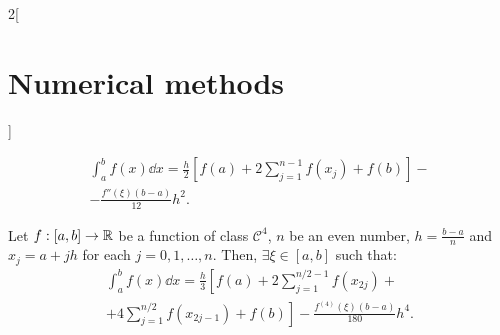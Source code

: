 \documentclass[../../../main.tex]{subfiles}
\begin{document}
\begin{multicols}{2}[\section{Numerical methods}]
\begin{theorem}
    \begin{multline*}
        \int_a^bf(x)\dd x=\frac{h}{2}\left[f(a)+2\sum_{j=1}^{n-1}f(x_j)+f(b)\right]-\\-\frac{f''(\xi)(b-a)}{12}h^2.
    \end{multline*}
\end{theorem}
\begin{theorem}
    Let $f:[a,b]\rightarrow\mathbb{R}$ be a function of class $\mathcal{C}^4$, $n$ be an even number, $h=\frac{b-a}{n}$ and $x_j=a+jh$ for each $j=0,1,\ldots,n$. Then, $\exists\xi\in[a,b]$ such that:
    \begin{multline*}
        \int_a^bf(x)\dd x=\frac{h}{3}\left[f(a)+2\sum_{j=1}^{n/2-1}f(x_{2j})+\right.\\\left.+4\sum_{j=1}^{n/2}f(x_{2j-1})+f(b)\right]-\frac{f^{(4)}(\xi)(b-a)}{180}h^4.
    \end{multline*}
\end{theorem}
\end{multicols}
\end{document}
